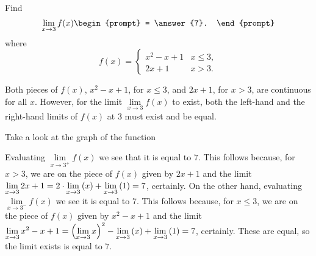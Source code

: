 \documentclass{ximera}
\author{Gregory Hartman \and Matthew Carr}
\begin{document}
\begin{exercise}



 Find 
  \[
  \displaystyle \lim_{x\to 3} f(x)
  \begin{prompt}
  = \answer{7}.
  \end{prompt}
  \]
  where
  \[
  f(x) = \left\{\begin{array}{cl} x^2-x+1 & x\leq 3, \\ 2x+1 & x>3. \end{array}\right.
  \]
    \begin{hint}
     Both pieces of $f(x)$, $x^2-x+1$, for $x\leq3$, and $2x+1$, for $x>3$, are continuous for all $x$. However, for the limit $\lim\limits_{x\to3}f(x)$ to exist, both the left-hand and the right-hand limits of $f(x)$ at $3$ must exist and be equal.
    \end{hint}
     \begin{hint}
    	Take a look at the graph of the function
    \begin{center}
      \end{center} 
    \end{hint}
    \begin{hint}
     Evaluating $\lim\limits_{x\to3^{+}}f(x)$ we see that it is equal to $7$. This follows because, for $x>3$, we are on the piece of $f(x)$ given by $2x+1$ and the limit $\lim\limits_{x\to3}2x+1=2\cdot\lim\limits_{x\to 3}\p{x}+\lim\limits_{x\to3}\p{1}=7$, certainly. On the other hand, evaluating $\lim\limits_{x\to3^{-}}f(x)$ we see it is equal to $7$. This follows because, for $x\leq3$, we are on the piece of $f(x)$ given by $x^2-x+1$ and the limit $\lim\limits_{x\to3}x^2-x+1=\p{\lim\limits_{x\to3}x}^2-\lim\limits_{x\to 3}\p{x}+\lim\limits_{x\to3}\p{1}=7$, certainly. These are equal, so the limit exists is equal to $7$.
    \end{hint}
\end{exercise}
\end{document}
